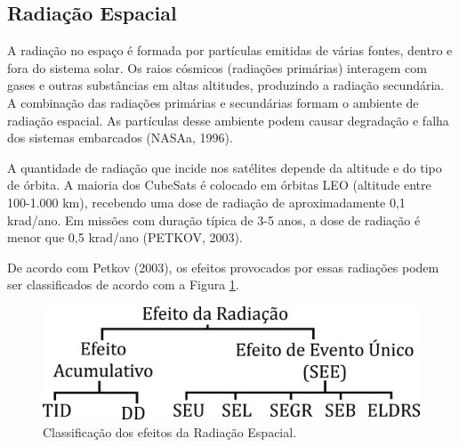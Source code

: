 \subsection{Radiação Espacial}

A radiação no espaço é formada por partículas emitidas de várias fontes, dentro e fora do sistema solar. Os raios cósmicos (radiações primárias) interagem com gases e outras substâncias em altas altitudes, produzindo a radiação secundária. A combinação das radiações primárias e secundárias formam o ambiente de radiação espacial. As partículas desse ambiente podem causar degradação e falha dos sistemas embarcados (NASAa, 1996).

A quantidade de radiação que incide nos satélites depende da altitude e do tipo de órbita. A maioria dos CubeSats é colocado em órbitas LEO (altitude entre 100-1.000 km), recebendo uma dose de radiação de aproximadamente 0,1 krad/ano. Em missões com duração típica de 3-5 anos, a dose de radiação é menor que 0,5 krad/ano  (PETKOV, 2003).

De acordo com Petkov (2003), os efeitos provocados por essas radiações podem ser classificados de acordo com a Figura \ref{fig17}.

\begin{figure}[h]
	\centering
	\includegraphics[keepaspectratio=true,scale=0.55]{figuras/radiation.jpg}
	\caption{Classificação dos efeitos da Radiação Espacial.}
	\label{fig17}
\end{figure}
\FloatBarrier

